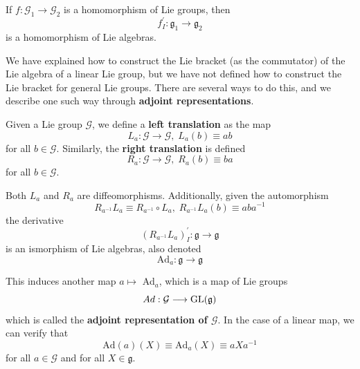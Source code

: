   \begin{proposition}
    If $f: \mathcal{G}_1 \longrightarrow \mathcal{G}_2$ is a homomorphism of Lie groups, then 
    \begin{equation}
      f_I^\prime: \mathfrak{g}_1 \longrightarrow \mathfrak{g}_2
    \end{equation}
    is a homomorphism of Lie algebras. 
  \end{proposition}

  We have explained how to construct the Lie bracket (as the commutator) of the Lie algebra of a linear Lie group, but we have not defined how to construct the Lie bracket for general Lie groups. There are several ways to do this, and we describe one such way through \textbf{adjoint representations}. 

  \begin{definition}
    Given a Lie group $\mathcal{G}$, we define a \textbf{left translation} as the map
    \begin{equation}
      L_a: \mathcal{G} \longrightarrow \mathcal{G}, \; L_a (b) \equiv a b
    \end{equation}
    for all $b \in \mathcal{G}$. Similarly, the \textbf{right translation} is defined
    \begin{equation}
      R_a: \mathcal{G} \longrightarrow \mathcal{G}, \; R_a (b) \equiv b a
    \end{equation}
    for all $b \in \mathcal{G}$. 
  \end{definition}

  Both $L_a$ and $R_a$ are diffeomorphisms. Additionally, given the automorphism
  \begin{equation}
    R_{a^{-1}} L_a \equiv R_{a^{-1}} \circ L_a, \; R_{a^{-1}} L_a (b) \equiv a b a^{-1}
  \end{equation}
  the derivative
  \begin{equation}
    (R_{a^{-1}} L_a)^\prime_I: \mathfrak{g} \longrightarrow \mathfrak{g}
  \end{equation}
  is an ismorphism of Lie algebras, also denoted 
  \begin{equation}
    \text{Ad}_a: \mathfrak{g} \longrightarrow \mathfrak{g}
  \end{equation}

  \begin{definition}
    This induces another map $a \mapsto$ Ad$_a$, which is a map of Lie groups
    \begin{equation}
      Ad: \mathcal{G} \longrightarrow \operatorname{GL}(\mathcal{\mathfrak{g}})
    \end{equation}
    which is called the \textbf{adjoint representation of $\mathcal{G}$}. In the case of a linear map, we can verify that 
    \begin{equation}
      \text{Ad}(a) (X) \equiv \text{Ad}_a (X) \equiv a X a^{-1}
    \end{equation}
    for all $a \in \mathcal{G}$ and for all $X \in \mathfrak{g}$. 
  \end{definition}

